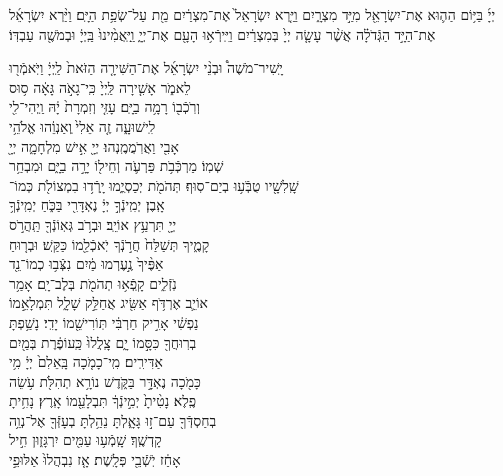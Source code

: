 \documentclass[twoside, openany, parskip=half, 11pt]{book}
\begin{document}
 
יְיָ֜ בַּיּ֥וֹם הַה֛וּא אֶת־יִשְׂרָאֵ֖ל מִיַּ֣ד מִצְרָ֑יִם וַיַּ֤רְא יִשְׂרָאֵל֙ אֶת־מִצְרַ֔יִם מֵ֖ת עַל־שְׂפַ֥ת הַיָּֽם׃ וַיַּ֨רְא יִשְׂרָאֵ֜ל אֶת־הַיָּ֣ד הַגְּֿדֹלָ֗ה אֲשֶׁ֨ר עָשָׂ֤ה יְיָ֙ בְּמִצְרַ֔יִם וַיִּֽירְֿא֥וּ הָעָ֖ם אֶת־יְיָ֑ וַֽיַּֽאֲמִ֨ינוּ֙ בַּֽיְיָ֔ וּבְמֹשֶׁ֖ה עַבְדּֽוֹ׃


 
יָֽשִׁיר־מֹשֶׁה֩ וּבְנֵ֨י יִשְׂרָאֵ֜ל אֶת־הַשִּׁירָ֤ה הַזֹּאת֙ לַֽיְיָ֔ וַיֹּֽאמְֿר֖וּ \\
לֵאמֹ֑ר \hfill אָשִׁ֤ירָה לַּֽיְיָ֙ כִּֽי־גָאֹ֣ה גָּאָ֔ה \hfill ס֥וּס \\
וְרֹֽכְֿב֖וֹ רָמָ֥ה בַיָּֽם׃ \hfill עָזִּ֤י וְזִמְרָת֙ יָ֔הּ וַֽיְהִי־לִ֖י \\
לִֽישׁוּעָ֑ה \hfill זֶ֤ה אֵלִי֙ ֽוְאַנְוֵ֔הוּ \hfill אֱלֹהֵ֥י \\
 אָבִ֖י וַאֲרֹֽמֲמֶֽנְהוּ׃ \hfill יְיָ֖ אִ֣ישׁ מִלְחָמָ֑ה יְיָ֖ \\
שְׁמֽוֹ׃ \hfill מַרְכְּֿבֹ֥ת פַּרְעֹ֛ה וְחֵיל֖וֹ יָרָ֣ה בַיָּ֑ם \hfill וּמִבְחַ֥ר\\
שָֽׁלִשָׁ֖יו טֻבְֹּֿע֥וּ בְיַם־סֽוּף׃ \hfill תְּהֹמֹ֖ת יְכַסְיֻ֑מוּ יָֽרְֿד֥וּ בִמְצוֹלֹ֖ת כְּמוֹ־\\
אָֽבֶן׃ \hfill יְמִֽינְֿךָ֣ יְיָ֔ נֶאְדָּרִ֖י בַּכֹּ֑חַ \hfill יְמִֽינְֿךָ֥ \\
יְיָ֖ תִּרְעַ֥ץ אוֹיֵֽב׃ \hfill וּבְרֹ֥ב גְּאֽוֹנְֿךָ֖ תַּֽהֲרֹ֣ס \\
קָמֶ֑יךָ \hfill תְּשַׁלַּח֙ חֲרֹ֣נְֿךָ יֹֽאכְֿלֵ֖מוֹ כַּקַּֽשׁ׃ \hfill וּבְר֤וּחַ \\
אַפֶּ֨יךָ֙ נֶ֣עֶרְמוּ מַ֔יִם \hfill נִצְּֿב֥וּ כְמוֹ־נֵ֖ד \\
נֹֽזְֿלִ֑ים \hfill קָֽפְֿא֥וּ תְהֹמֹ֖ת בְּלֶב־יָֽם׃ \hfill אָמַ֥ר \\
אוֹיֵ֛ב אֶרְדֹּ֥ף אַשִּׂ֖יג \hfill אֲחַלֵּ֣ק שָׁלָ֑ל תִּמְלָאֵ֣מוֹ \\
נַפְשִׁ֔י \hfill אָרִ֣יק חַרְבִּ֔י תּֽוֹרִישֵׁ֖מוֹ יָדִֽי׃ \hfill נָשַׁ֥פְתָּ \\
בְרֽוּחֲךָ֖ כִּסָּ֣מוֹ יָ֑ם \hfill צָֽלֲלוּ֙ כַּֽעוֹפֶ֔רֶת בְּמַ֖יִם \\
אַדִּירִֽים׃ \hfill מִֽי־כָמֹ֤כָה בָּֽאֵלִם֙ יְיָ֔ \hfill מִ֥י \\
כָּמֹ֖כָה נֶאְדָּ֣ר בַּקֹּ֑דֶשׁ \hfill נוֹרָ֥א תְהִלֹּ֖ת עֹ֥שֵׂה \\
פֶֽלֶא׃ \hfill נָטִ֨יתָ֙ יְמִ֣ינְֿךָ֔ תִּבְלָעֵ֖מוֹ אָֽרֶץ׃ \hfill נָחִ֥יתָ \\
בְחַסְדְּֿךָ֖ עַם־ז֣וּ גָּאָ֑לְתָּ \hfill נֵהַ֥לְתָּ בְעָזְּֿךָ֖ אֶל־נְוֵ֥ה \\
קָדְשֶֽׁךָ׃ \hfill שָֽׁמְֿע֥וּ עַמִּ֖ים יִרְגָּז֑וּן \hfill חִ֣יל \\
אָחַ֔ז יֹֽשְֿׁבֵ֖י פְּלָֽשֶׁת׃ \hfill אָ֤ז נִבְהֲלוּ֙ אַלּוּפֵ֣י \\
\end{document}
